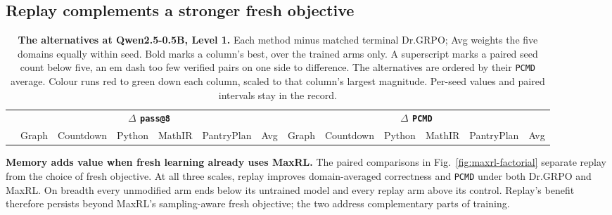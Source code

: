 \documentclass{article}
\newcommand{\1}{\mathbf 1}
\newcommand{\pmd}{\texttt{PCMD}}
\theoremstyle{remark}
\theoremstyle{definition}
\theoremstyle{plain}
\begin{document}
\subsection{Replay complements a stronger fresh objective}
\label{sec:results-maxrl}

\begin{table}[!tbp]
  \centering
  \caption{\textbf{The alternatives at Qwen2.5-0.5B, Level 1.} Each method minus
  matched terminal Dr.GRPO; Avg weights the five domains equally within seed.
  Bold marks a column's best, over the trained arms only. A superscript marks a
  paired seed count below five, an em dash too few verified pairs on one side
  to difference. The alternatives are ordered by their \pmd{} average. Colour runs red to green down each column, scaled to that
  column's largest magnitude. Per-seed values and paired intervals stay in
  the record.}
  \label{tab:direct-comparator-matrix}
  \scriptsize
  \setlength{\tabcolsep}{1.4pt}
  \renewcommand{\arraystretch}{0.92}
  \begin{tabular}{@{}l*{12}{r}@{}}
    \toprule
    & \multicolumn{6}{c}{\textbf{$\Delta$ \texttt{pass@8}}}
      & \multicolumn{6}{c}{\textbf{$\Delta$ \pmd{}}} \\
    \cmidrule(lr){2-7}\cmidrule(l){8-13}
    & Graph & Countdown & Python & MathIR & PantryPlan & Avg
      & Graph & Countdown & Python & MathIR & PantryPlan & Avg \\
    \midrule
    
  \end{tabular}
\end{table}

\textbf{Memory adds value when fresh learning already uses MaxRL.}
The paired comparisons in Fig.~\ref{fig:maxrl-factorial} separate replay
from the choice of fresh objective. At all three scales, replay improves
domain-averaged correctness and \pmd{} under both Dr.GRPO and MaxRL. On
breadth every unmodified arm ends below its untrained model and every replay
arm above its control. Replay's benefit therefore persists beyond MaxRL's
sampling-aware fresh objective; the two address complementary parts of
training.
\end{document}
